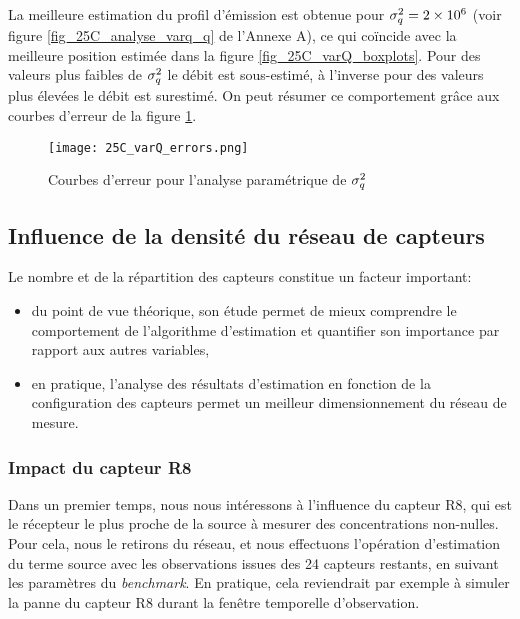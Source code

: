 La meilleure estimation du profil d'émission est obtenue pour $\sigma_q^2=2\times 10^6$ (voir figure \ref{fig_25C_analyse_varq_q} de l'Annexe A), ce qui coïncide avec la meilleure position estimée dans la figure \ref{fig_25C_varQ_boxplots}. Pour des valeurs plus faibles de $\sigma_q^2$ le débit est sous-estimé, à l'inverse pour des valeurs plus élevées le débit est surestimé. On peut résumer ce comportement grâce aux courbes d'erreur de la figure \ref{fig_25C_varq_erreurs}.

         \begin{figure}[h!]
         	\centering
         	\texttt{[image: 25C\_varQ\_errors.png]}
         	\caption{Courbes d'erreur pour l'analyse paramétrique de $\sigma_q^2$}
         	\label{fig_25C_varq_erreurs}
         \end{figure}

\subsection{Influence de la densité du réseau de capteurs}

Le nombre et de la répartition des capteurs constitue un facteur important: 

\begin{itemize}
	\item du point de vue théorique, son étude permet de mieux comprendre le comportement de l'algorithme d'estimation et quantifier son importance par rapport aux autres variables,
	\item en pratique, l'analyse des résultats d'estimation en fonction de la configuration des capteurs permet un meilleur dimensionnement du réseau de mesure.\\
\end{itemize}

\subsubsection{Impact du capteur R8}

Dans un premier temps, nous nous intéressons à l'influence du capteur R8, qui est le récepteur le plus proche de la source à mesurer des concentrations non-nulles. Pour cela, nous le retirons du réseau, et nous effectuons l'opération d'estimation du terme source avec les observations issues des 24 capteurs restants, en suivant les paramètres du \textit{benchmark}. En pratique, cela reviendrait par exemple à simuler la panne du capteur R8 durant la fenêtre temporelle d'observation.\\


